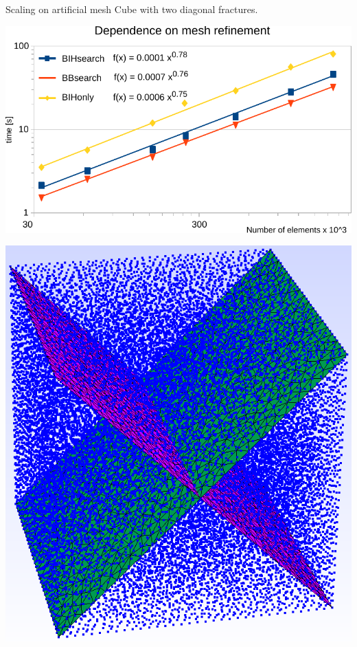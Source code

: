\documentclass[10pt]{beamer} %
\begin{document}
\begin{frame}{Scaling on artificial mesh}
  Cube with two diagonal fractures.
  
  \vspace{3ex}
  \hspace{-5ex}  
  \begin{minipage}{0.55\textwidth}
    \includegraphics[scale=0.5]{graphics/intersections_test1_cube_speed_scaling.pdf}
  \end{minipage}
  \hspace{5ex}
    \begin{minipage}{0.4\textwidth}
    \begin{center}
    \includegraphics[scale=0.2]{graphics/cube_mesh.png} 
    \end{center}
    \end{minipage}
\end{frame}
\end{document}
